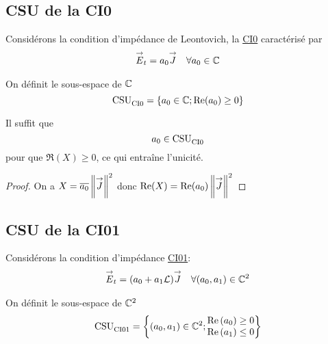   \subsection{CSU de la CI0}
    Considérons la condition d’impédance de Leontovich, la \hyperlink{ci0}{CI0} caractérisé par
    \begin{align}
      \label{eq:unicite:ci0}
      {\overset{\rightarrow}{E}}_t = a_0 {\overset{\rightarrow}{J}} && \forall a_0 \in \mathbb C
    \end{align}

    \begin{defn}
      \label{def:csu:ci0}
      On définit le sous-espace de \(\mathbb C\)
      \begin{equation*}
        \operatorname{CSU}_{\operatorname{CI0}}^{{}} = \lbrace a_0 \in \mathbb C; \operatorname{Re}(a_0) \ge 0 \rbrace
      \end{equation*}
    \end{defn}

    \begin{prop}
      Il suffit que
      \begin{equation*}
        a_0 \in \operatorname{CSU}_{\operatorname{CI0}}^{{}}
      \end{equation*}
      pour que \(\Re(X)\ge 0\), ce qui entraîne l'unicité.
    \end{prop}
    \begin{proof}
      On a \( X = {\overline{a_0}}\left\lVert{\overset{\rightarrow}{J}}\right\rVert^2\) donc \(\operatorname{Re}(X) = \operatorname{Re}(a_0)\left\lVert{\overset{\rightarrow}{J}}\right\rVert^2 \)
    \end{proof}
  \subsection{CSU de la CI01}
    Considérons la condition d’impédance \hyperlink{ci01}{CI01}:
    \begin{align}
      \label{eq:unicite:ci01}
      {\overset{\rightarrow}{E}}_t = (a_0 + a_1 \mathcal{L}){\overset{\rightarrow}{J}} && \forall (a_0, a_1) \in \mathbb C^2
    \end{align}

    \begin{defn}
      \label{def:csu:ci01}
      On définit le sous-espace de \(\mathbb C^2\)
      \begin{equation*}
        \operatorname{CSU}_{\operatorname{CI01}}^{{}} = \left\lbrace (a_0,a_1) \in \mathbb C^2; \begin{matrix}
        \operatorname{Re}\left(a_0\right) \ge 0
        \\
        \operatorname{Re}\left(a_1\right) \le 0
        \end{matrix}
        \right\rbrace
      \end{equation*}
    \end{defn}

